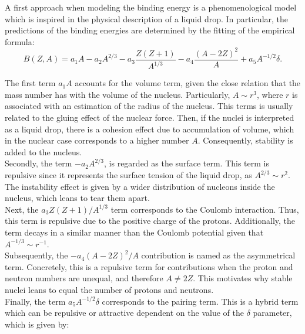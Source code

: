 \documentclass[openany]{book}
\begin{document}
A first approach when modeling the binding energy is a phenomenological model which is inspired in the physical description of a liquid drop. In particular, the predictions of the binding energies are determined by the fitting of the empirical formula: \\ 

\begin{equation} \label{eq:liquidDrop_bindingEnergy}
	B(Z,A )= a_1A - a_2A^{2/3} - a_3 \frac{Z(Z+1)}{A^{1/3}} - a_4 \frac{(A - 2Z)^2}{A}   +   a_5 A^{-1/2} \delta.
\end{equation}

The first term $a_1A$ accounts for the volume term, given the close relation that the mass number has with the volume of the nucleus. Particularly, $A \sim r^3$, where $r$ is associated with an estimation of the radius of the nucleus. This terms is usually related to the gluing effect of the nuclear force. Then, if the nuclei is interpreted as a liquid drop, there is a cohesion effect due to accumulation of volume, which in the nuclear case corresponds to a higher number $A$. Consequently, stability is added to the nucleus.   \\

Secondly, the term $- a_2A^{2/3} $, is regarded as the surface term. This term is repulsive since it represents the surface tension of the liquid drop, as $A^{2/3}  \sim r^2$. The instability effect is given by a wider distribution of nucleons inside the nucleus, which leans to tear them apart. \\

Next, the $ a_3 Z(Z+1)/A^{1/3}$ term corresponds to the Coulomb interaction. Thus, this term is repulsive due to the positive charge of the protons. Additionally, the term decays in a similar manner than the Coulomb potential given that $A^{-1/3} \sim r^{-1}$. \\

Subsequently, the $ -a_4 (A - 2Z)^2/A$ contribution is named as the asymmetrical term. Concretely, this is a repulsive term for contributions when the proton and neutron numbers are unequal, and therefore $A \neq 2Z$. This motivates why stable nuclei leans to equal the number of protons and neutrons.\\ 

Finally, the term $a_5 A^{-1/2} \delta$ corresponds to the pairing term. This is a hybrid term which can be repulsive or attractive dependent on the value of the $\delta$ parameter, which is given by:
\end{document}
